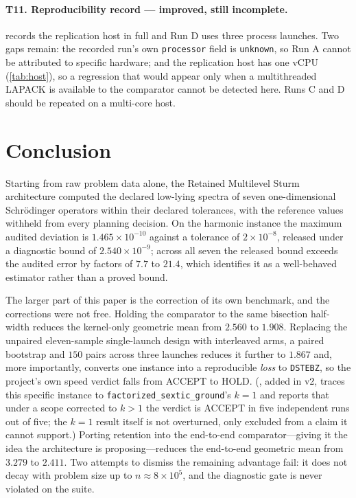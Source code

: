 \documentclass[twocolumn,10pt,a4paper]{article}
\theoremstyle{plain}
\theoremstyle{definition}
\newcommand{\ACCEPT}{\textsf{ACCEPT}}
\newcommand{\HOLD}{\textsf{HOLD}}
\begin{document}
\paragraph{T11. Reproducibility record --- \textbf{improved, still incomplete}.}
 records the replication host in full and Run D uses three
process launches. Two gaps remain: the recorded run's own \texttt{processor}
field is \texttt{unknown}, so Run A cannot be attributed to specific hardware;
and the replication host has one vCPU (\cref{tab:host}), so a regression that
would appear only when a multithreaded LAPACK is available to the comparator
cannot be detected here. Runs C and D should be repeated on a multi-core host.

\section{Conclusion}
\label{sec:conclusion}

Starting from raw problem data alone, the Retained Multilevel Sturm architecture
computed the declared low-lying spectra of seven one-dimensional Schr\"odinger
operators within their declared tolerances, with the reference values withheld
from every planning decision. On the harmonic instance the maximum audited
deviation is $1.465\times10^{-10}$ against a tolerance of $2\times10^{-8}$,
released under a diagnostic bound of $2.540\times10^{-9}$; across all seven the
released bound exceeds the audited error by factors of $7.7$ to $21.4$, which
identifies it as a well-behaved estimator rather than a proved bound.

The larger part of this paper is the correction of its own benchmark, and the
corrections were not free. Holding the comparator to the same bisection
half-width reduces the kernel-only geometric mean from $2.560$ to $1.908$.
Replacing the unpaired eleven-sample single-launch design with interleaved arms,
a paired bootstrap and $150$ pairs across three launches reduces it further to
$1.867$ and, more importantly, converts one instance into a reproducible
\emph{loss} to \texttt{DSTEBZ}, so the project's own speed verdict falls from
\ACCEPT{} to \HOLD{}. (, added in v2, traces this
specific instance to \texttt{factorized\_sextic\_ground}'s $k=1$ and reports
that under a scope corrected to $k>1$ the verdict is \ACCEPT{} in five
independent runs out of five; the $k=1$ result itself is not overturned,
only excluded from a claim it cannot support.) Porting retention into the end-to-end comparator---giving
it the idea the architecture is proposing---reduces the end-to-end geometric
mean from $3.279$ to $2.411$. Two attempts to dismiss the remaining advantage
fail: it does not decay with problem size up to $n \approx 8\times10^{5}$, and
the diagnostic gate is never violated on the suite.
\end{document}
